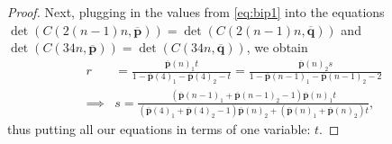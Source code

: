 \documentclass[10pt,a4paper]{amsart}
\begin{document}
\begin{proof}
    Next, plugging in the values from \cref{eq:bip1} into the equations $\det(C(2(n-1)n,\overline{\mathbf{p}}))=\det(C(2(n-1)n,\overline{\mathbf{q}}))$ and $\det(C(34n,\overline{\mathbf{p}}))=\det(C(34n,\overline{\mathbf{q}}))$, we obtain
    \begin{equation}\label{eq:bip2}
    \begin{split}
        r&=\frac{\overline{\mathbf{p}}(n)_1t}{1-\overline{\mathbf{p}}(4)_1-\overline{\mathbf{p}}(4)_2-t}=\frac{\overline{\mathbf{p}}(n)_2s}{1-\overline{\mathbf{p}}(n-1)_1-\overline{\mathbf{p}}(n-1)_2-2} \\
        \implies&s=\frac{(\overline{\mathbf{p}}(n-1)_1+\overline{\mathbf{p}}(n-1)_2-1)\overline{\mathbf{p}}(n)_1t}{(\overline{\mathbf{p}}(4)_1+\overline{\mathbf{p}}(4)_2-1)\overline{\mathbf{p}}(n)_2+(\overline{\mathbf{p}}(n)_1+\overline{\mathbf{p}}(n)_2)t},
    \end{split}
    \end{equation}
    thus putting all our equations in terms of one variable: $t$.


\end{proof}
\end{document}
